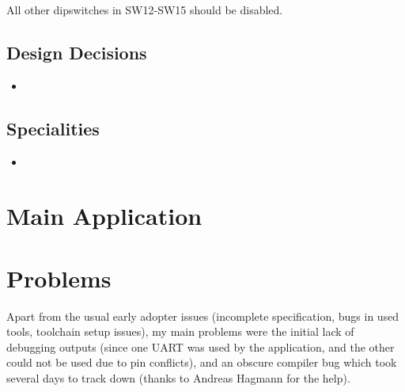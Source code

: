 \documentclass[12pt,a4paper,titlepage,oneside]{article}
\begin{document}
All other dipswitches in SW12-SW15 should be disabled.

\subsection{Design Decisions}

\begin{itemize}

 \item
 
\end{itemize}


\subsection{Specialities}

\begin{itemize}

 \item
 
\end{itemize}


\section{Main Application}


\section{Problems}

Apart from the usual early adopter issues (incomplete specification, bugs in
used tools, toolchain setup issues), my main problems were the initial lack of
debugging outputs (since one UART was used by the application, and the other
could not be used due to pin conflicts), and an obscure compiler bug which took
several days to track down (thanks to Andreas Hagmann for the help).
\end{document}
